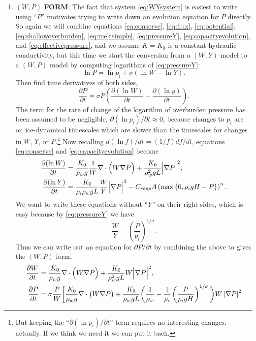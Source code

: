 \documentclass[11pt]{amsart}
\newcommand{\Creep}{C_{reep}}
\begin{document}
\begin{enumerate}
\medskip
\item $(W,P)$ \textbf{FORM}:  The fact that system \eqref{eq:WYsystem} is easiest to write using ``$P$'' motivates trying to write down an evolution equation for $P$ directly.  So again we will combine equations \eqref{eq:conserve}, \eqref{eq:flux}, \eqref{eq:potential}, \eqref{eq:shallowoverburden}, \eqref{eq:meltsimple}, \eqref{eq:pressureY},  \eqref{eq:capacityevolution}, and \eqref{eq:effectivepressure}, and we assume $K=K_0$ is a constant hydraulic conductivity, but this time we start the conversion from a $(W,Y)$ model to a $(W,P)$ model by computing logarithms of \eqref{eq:pressureY}:
  $$\ln P = \ln p_i + \sigma (\ln W - \ln Y).$$
Then find time derivatives of both sides,
\begin{equation*}
   \frac{\partial P}{\partial t} = \sigma P \left(\frac{\partial(\ln W)}{\partial t} - \frac{\partial(\ln y)}{\partial t}\right).
\end{equation*}
The term for the rate of change of the logarithm of overburden pressure has been assumed to be negligible, $\partial (\ln p_i)/\partial t \approx 0$, because changes to $p_i$ are on ice-dynamical timescales which are slower than the timescales for changes in $W$, $Y$, or $P$.\footnote{But keeping the ``$\partial (\ln p_i)/\partial t$'' term requires no interesting changes, actually.  If we think we need it we can put it back.}  Now recalling  $d(\ln f)/dt = (1/f) df/dt$, equations \eqref{eq:conserve} and \eqref{eq:capacityevolution} become
\begin{align*}
  \frac{\partial (\ln W)}{\partial t} &= \frac{K_0}{\rho_w g} \frac{1}{W} \nabla \cdot \Big(W \nabla P\Big) + \frac{K_0}{\rho_w^2 g L} \Big|\nabla P\Big|^2, \\
  \frac{\partial (\ln Y)}{\partial t} &= \frac{K_0}{\rho_i \rho_w g L} \frac{W}{Y} \Big|\nabla P\Big|^2 \notag - \Creep A \left(\max\left\{0,\rho_i g H - P\right\}\right)^n.
\end{align*}
We want to write these equations without ``$Y$'' on their right sides, which is easy because by \eqref{eq:pressureY} we have
	$$\frac{W}{Y} = \left(\frac{P}{p_i}\right)^{1/\sigma}.$$
Thus we can write out an equation for $\partial P/\partial t$ by combining the above to gives the $(W,P)$ form,
\begin{align}
\frac{\partial W}{\partial t} &= \frac{K_0}{\rho_w g} \nabla \cdot \Big(W \nabla P\Big) + \frac{K_0}{\rho_w^2 g L} W \Big|\nabla P\Big|^2,  \label{eq:WPsystem} \\
\frac{\partial P}{\partial t} &= \sigma \frac{P}{W} \bigg[\frac{K_0}{\rho_w g} \nabla \cdot \big(W \nabla P\big) + \frac{K_0}{\rho_w g L} \bigg(\frac{1}{\rho_w} - \frac{1}{\rho_i} \left(\frac{P}{\rho_i g H}\right)^{1/\sigma}\bigg) W \left|\nabla P\right|^2 \notag \\

\end{align}
\end{enumerate}
\end{document}
